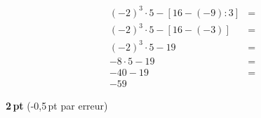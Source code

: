 \begin{parts}
\vspace{10pt}{\footnotesize\raggedleft Espace pour ta démarche et tes calculs\par}
	\begin{solutionorgrid}[200pt]
		\begin{align*}
		(-2)^3 \cdot 5 - \left[16 - (-9):3\right]&=\\
		(-2)^3 \cdot 5 - \left[16 - (-3)\right]&=\\
		(-2)^3 \cdot 5 - 19&=\\
		-8 \cdot 5 - 19&=\\
		-40 - 19&=\\
		-59&
		\end{align*}
	
	\hfill\textbf{2\,pt} (-0,5\,pt par erreur)
	\end{solutionorgrid}
\end{parts}
